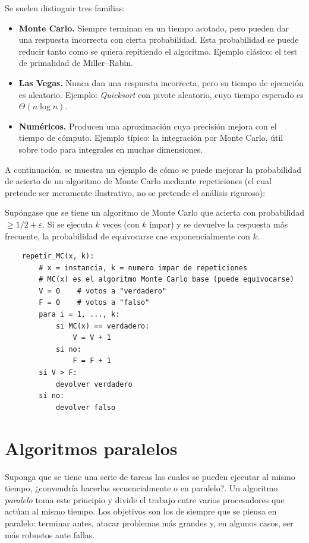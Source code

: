 \documentclass[12pt,letterpaper]{article}
\begin{document}
Se suelen distinguir tres familias:
\begin{itemize}
    \item \textbf{Monte Carlo.} Siempre terminan en un tiempo acotado, pero 
    pueden dar una respuesta incorrecta con cierta probabilidad. Esta 
    probabilidad se puede reducir tanto como se quiera repitiendo el algoritmo. 
    Ejemplo clásico: el test de primalidad de Miller--Rabin.
    \item \textbf{Las Vegas.} Nunca dan una respuesta incorrecta, pero su 
    tiempo de ejecución es aleatorio. Ejemplo: \emph{Quicksort} con pivote 
    aleatorio, cuyo tiempo esperado es $\Theta(n\log n)$.
    \item \textbf{Numéricos.} Producen una aproximación cuya precisión mejora 
    con el tiempo de cómputo. Ejemplo típico: la integración por Monte Carlo, 
    útil sobre todo para integrales en muchas dimensiones.
\end{itemize}

A continuación, se muestra un ejemplo de cómo se puede mejorar la probabilidad 
de acierto de un algoritmo de Monte Carlo mediante repeticiones (el cual 
pretende ser meramente ilustrativo, no se pretende el análisis riguroso):

Supóngase que se tiene un algoritmo de Monte Carlo que acierta con 
probabilidad $\geq 1/2 + \varepsilon$. Si se ejecuta $k$ veces (con $k$ impar) 
y se devuelve la respuesta más frecuente, la probabilidad de equivocarse cae 
exponencialmente con $k$.

\begin{verbatim}
    repetir_MC(x, k):
        # x = instancia, k = numero impar de repeticiones
        # MC(x) es el algoritmo Monte Carlo base (puede equivocarse)
        V = 0    # votos a "verdadero"
        F = 0    # votos a "falso"
        para i = 1, ..., k:
            si MC(x) == verdadero:
                V = V + 1
            si no:
                F = F + 1
        si V > F:
            devolver verdadero
        si no:
            devolver falso
\end{verbatim}

\section{Algoritmos paralelos}
\label{sec:par}

Suponga que se tiene una serie de tareas las cuales se pueden ejecutar al 
mismo tiempo, ¿convendría hacerlas secuencialmente o en paralelo?. Un algoritmo 
\emph{paralelo} toma este principio y divide el trabajo entre varios 
procesadores que actúan al mismo tiempo. Los objetivos son los de siempre que 
se piensa en paralelo: terminar antes, atacar problemas más grandes y, en 
algunos casos, ser más robustos ante fallas.
\end{document}
